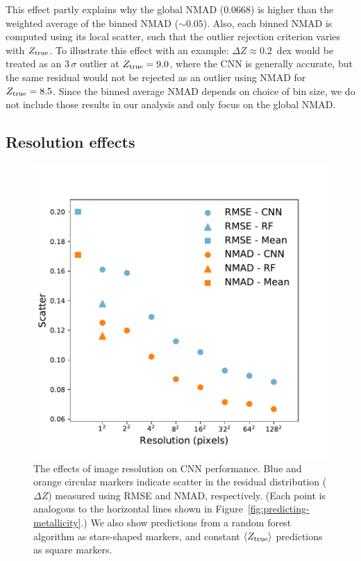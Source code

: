 \documentclass[fleqn,usenatbib]{mnras}
\begin{document}
This effect partly explains why the global NMAD (0.0668) is higher than the weighted average of the binned NMAD ($\sim 0.05$). Also, each binned NMAD is computed using its local scatter, such that the outlier rejection criterion varies with $Z_{\rm true}$. To illustrate this effect with an example: $\Delta Z \approx 0.2$~dex would be treated as an $3\,\sigma$ outlier at $Z_{\rm true} = 9.0$, where the CNN is generally accurate, but the same residual would not be rejected as an outlier using NMAD for $Z_{\rm true} = 8.5$.
Since the binned average NMAD depends on choice of bin size, we do not include those results in our analysis and only focus on the global NMAD.

\subsection{Resolution effects} \label{sec:resolution}

\begin{figure}
	\includegraphics[width=\columnwidth]{04-resolution.pdf}
	\caption{\label{fig:resolution}
		The effects of image resolution on CNN performance. Blue and orange circular markers indicate scatter in the residual distribution ($\Delta Z$) measured using RMSE and NMAD, respectively. (Each point is analogous to the horizontal lines shown in Figure~\ref{fig:predicting-metallicity}.) We also show predictions from a random forest algorithm as stars-shaped markers, and constant $\langle Z_{\rm true}\rangle$ predictions as square markers.}
\end{figure}
\end{document}

